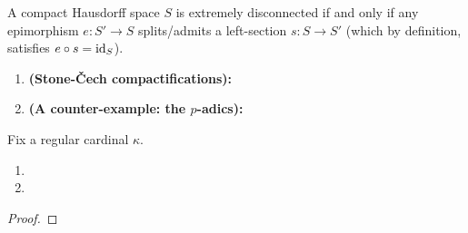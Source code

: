             \begin{definition} \label{def: extrememly_disconnected_sets}
                A compact Hausdorff space $S$ is extremely disconnected if and only if any epimorphism $e: S' \to S$ splits/admits a left-section $s: S \to S'$ (which by definition, satisfies $e \circ s = \mathrm{id}_S$).  
            \end{definition}
            \begin{example}
                \noindent
                \begin{enumerate}
                    \item \textbf{(Stone-\v{C}ech compactifications):}
                    \item \textbf{(A counter-example: the $p$-adics):}
                \end{enumerate}
            \end{example}
            
            \begin{lemma} \label{lemma: condensed_sets_and_extremely_disconnected_sets}
                Fix a regular cardinal $\kappa$. 
                \begin{enumerate}
                    \item 
                    \item 
                \end{enumerate}
            \end{lemma}
                \begin{proof}
                    
                \end{proof}
            
